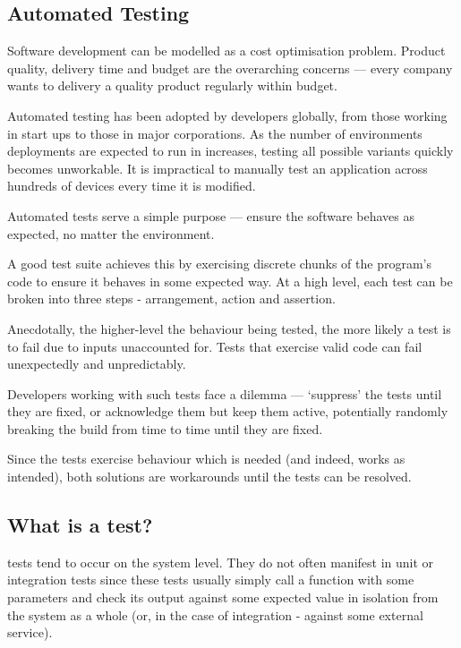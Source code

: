 \subsection{Automated Testing}

Software development can be modelled as a cost optimisation problem. Product quality, delivery time and budget are the overarching concerns --- every company wants to delivery a quality product regularly within budget.

Automated testing has been adopted by developers globally, from those working in start ups to those in major corporations. As the number of environments deployments are expected to run in increases, testing all possible variants quickly becomes unworkable. It is impractical to manually test an application across hundreds of devices every time it is modified.

Automated tests serve a simple purpose --- ensure the software behaves as expected, no matter the environment.

A good test suite achieves this by exercising discrete chunks of the program's code to ensure it behaves in some expected way. At a high level, each test can be broken into three steps - arrangement, action and assertion.

Anecdotally, the higher-level the behaviour being tested, the more likely a test is to fail due to inputs unaccounted for. Tests that exercise valid code can fail unexpectedly and unpredictably.

Developers working with such tests face a dilemma --- {\lq}suppress{\rq} the tests until they are fixed, or acknowledge them but keep them active, potentially randomly breaking the build from time to time until they are fixed.

Since the tests exercise behaviour which is needed (and indeed, works as intended), both solutions are workarounds until the tests can be resolved.

\subsection{What is a \flaky{} test?}

\flaky{} tests tend to occur on the system level. They do not often manifest in unit or integration tests since these tests usually simply call a function with some parameters and check its output against some expected value in isolation from the system as a whole (or, in the case of integration - against some external service).

